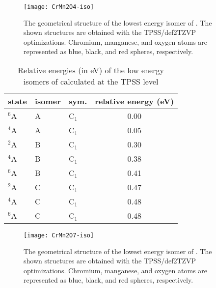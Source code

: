 \begin{figure}
	\centering
	\texttt{[image: CrMn2O4-iso]}
	\caption{The geometrical structure of the lowest energy isomer of . The shown structures are obtained with the TPSS/def2TZVP optimizations. Chromium, manganese, and oxygen atoms are represented as blue, black, and red spheres, respectively.}
	\label{figs:CrMn2O4}
\end{figure}





\begin{table}[]
	\centering
	\caption{Relative energies (in eV) of the low energy isomers of  calculated at the TPSS level}
	\begin{tabular}{@{}lllc@{}}
	\toprule
	state & isomer & sym. & relative energy (eV) \\ \midrule
	$^6$A    & A      & C$_1$   & 0.00                 \\
	$^4$A    & A      & C$_1$   & 0.05                 \\
	$^2$A    & B      & C$_1$   & 0.30                 \\
	$^4$A    & B      & C$_1$   & 0.38                 \\
	$^6$A    & B      & C$_1$   & 0.41                 \\
	$^2$A    & C      & C$_1$   & 0.47                 \\
	$^4$A    & C      & C$_1$   & 0.48                 \\
	$^6$A    & C      & C$_1$   & 0.48                 \\ \bottomrule
	\end{tabular}
\end{table}


\begin{figure}
	\centering
	\texttt{[image: CrMn2O7-iso]}
	\caption{The geometrical structure of the lowest energy isomer of . The shown structures are obtained with the TPSS/def2TZVP optimizations. Chromium, manganese, and oxygen atoms are represented as blue, black, and red spheres, respectively.}
	\label{figs:CrMn2O7}
\end{figure}







